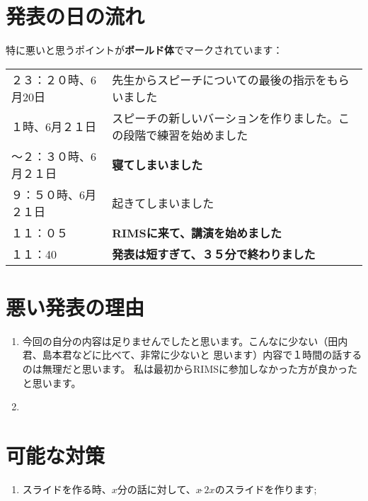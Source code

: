 \documentclass[12pt]{article} %
\begin{document}
\section{発表の日の流れ}
特に悪いと思うポイントが\textbf{ボールド体}でマークされています：
\begin{center}
	\begin{tabular}[]{lp{}}
		２３：２０時、6月20日&先生からスピーチについての最後の指示をもらいました\\
		１時、6月２１日&スピーチの新しいバーションを作りました。この段階で練習を始めました\\
		〜２：３０時、6月２１日&{\bf 寝てしまいました}\\
		９：５０時、6月２１日&起きてしまいました\\
		１１：０５&{\bf RIMSに来て、講演を始めました}\\
		１１：40&{\bf 発表は短すぎて、３５分で終わりました}\\
	\end{tabular}
\end{center}
\section{悪い発表の理由}
\begin{enumerate}
	\item 今回の自分の内容は足りませんでしたと思います。こんなに少ない（田内君、島本君などに比べて、非常に少ないと
		思います）内容で１時間の話するのは無理だと思います。
		私は最初からRIMSに参加しなかった方が良かったと思います。
	\item

\end{enumerate}
\section{可能な対策}
\begin{enumerate}
	\item スライドを作る時、$x$分の話に対して、$x
		\widetilde\; {2x}$のスライドを作ります;
\end{enumerate}
\end{document}
